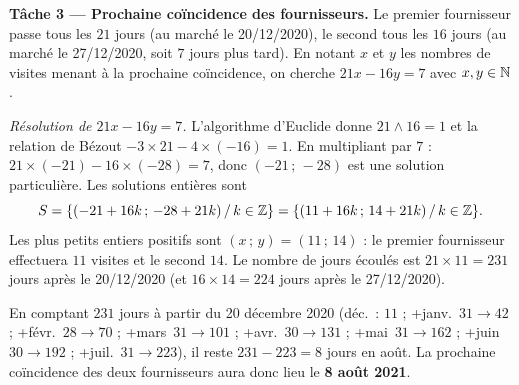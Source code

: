 \smallskip
\noindent\textbf{Tâche 3 — Prochaine coïncidence des fournisseurs.}
Le premier fournisseur passe tous les $21$ jours (au marché le 20/12/2020), le second tous les
$16$ jours (au marché le 27/12/2020, soit $7$ jours plus tard). En notant $x$ et $y$ les nombres de
visites menant à la prochaine coïncidence, on cherche $21x-16y=7$ avec $x,y\in\mathbb{N}$.

\emph{Résolution de $21x-16y=7$.} L'algorithme d'Euclide donne $21\wedge16=1$ et la relation de
Bézout $-3\times21-4\times(-16)=1$. En multipliant par $7$ :
$21\times(-21)-16\times(-28)=7$, donc $(-21\,;\,-28)$ est une solution particulière. Les solutions
entières sont
\[
S=\{(-21+16k\,;\,-28+21k)\,/\,k\in\mathbb{Z}\}=\{(11+16k\,;\,14+21k)\,/\,k\in\mathbb{Z}\}.
\]
Les plus petits entiers positifs sont $(x\,;\,y)=(11\,;\,14)$ : le premier fournisseur effectuera
$11$ visites et le second $14$. Le nombre de jours écoulés est
$21\times11=231$ jours après le 20/12/2020 (et $16\times14=224$ jours après le 27/12/2020).

En comptant $231$ jours à partir du 20 décembre 2020 (déc.~: $11$ ; +janv.~$31\to42$ ; +févr.~$28\to70$ ;
+mars~$31\to101$ ; +avr.~$30\to131$ ; +mai~$31\to162$ ; +juin~$30\to192$ ; +juil.~$31\to223$),
il reste $231-223=8$ jours en août. La prochaine coïncidence des deux fournisseurs aura donc lieu
le \textbf{8 août 2021}.
